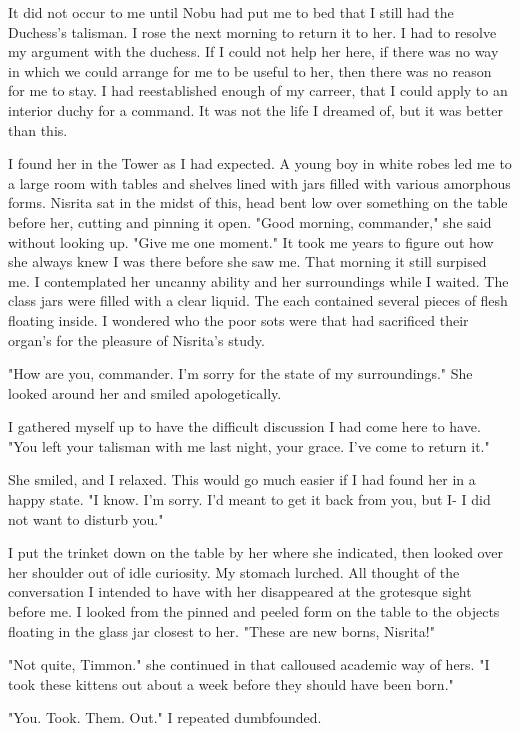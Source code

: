 \documentclass{article}
\begin{document}
It did not occur to me until Nobu had put me to bed that I still had the Duchess's talisman. I rose the next morning to return it to her. I had to resolve my argument with the duchess. If I could not help her here, if there was no way in which we could arrange for me to be useful to her, then there was no reason for me to stay. I had reestablished enough of my carreer, that I could apply to an interior duchy for a command. It was not the life I dreamed of, but it was better than this.

I found her in the Tower as I had expected. A young boy in white robes led me to a large room with tables and shelves lined with jars filled with various amorphous forms. Nisrita sat in the midst of this, head bent low over something on the table before her, cutting and pinning it open. "Good morning, commander," she said without looking up. "Give me one moment." It took me years to figure out how she always knew I was there before she saw me. That morning it still surpised me. I contemplated her uncanny ability and her surroundings while I waited. The class jars were filled with a clear liquid. The each contained several pieces of flesh floating inside. I wondered who the poor sots were that had sacrificed their organ's for the pleasure of Nisrita's study.

"How are you, commander. I'm sorry for the state of my surroundings." She looked around her and smiled apologetically.

I gathered myself up to have the difficult discussion I had come here to have. "You left your talisman with me last night, your grace. I've come to return it."

She smiled, and I relaxed. This would go much easier if I had found her in a happy state. "I know. I'm sorry. I'd meant to get it back from you, but I- I did not want to disturb you."

I put the trinket down on the table by her where she indicated, then looked over her shoulder out of idle curiosity. My stomach lurched. All thought of the conversation I intended to have with her disappeared at the grotesque sight before me. I looked from the pinned and peeled form on the table to the objects floating in the glass jar closest to her. "These are new borns, Nisrita!"

"Not quite, Timmon." she continued in that calloused academic way of hers. "I took these kittens out about a week before they should have been born."

"You. Took. Them. Out." I repeated dumbfounded.
\end{document}
